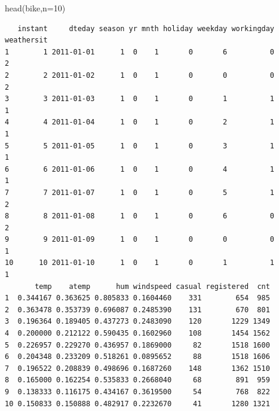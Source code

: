\documentclass[
  letterpaper,
  DIV=11,
  numbers=noendperiod]{scrreprt}
\newenvironment{Shaded}{\begin{snugshade}}{\end{snugshade}}
\newcommand{\AttributeTok}[1]{\textcolor[rgb]{0.40,0.45,0.13}{#1}}
\newcommand{\DecValTok}[1]{\textcolor[rgb]{0.68,0.00,0.00}{#1}}
\newcommand{\FunctionTok}[1]{\textcolor[rgb]{0.28,0.35,0.67}{#1}}
\newcommand{\NormalTok}[1]{\textcolor[rgb]{0.00,0.23,0.31}{#1}}
\newcommand{\OtherTok}[1]{\textcolor[rgb]{0.00,0.23,0.31}{#1}}
\newcommand{\SpecialCharTok}[1]{\textcolor[rgb]{0.37,0.37,0.37}{#1}}
\newcommand{\StringTok}[1]{\textcolor[rgb]{0.13,0.47,0.30}{#1}}
\begin{document}
\begin{Shaded}
\begin{Highlighting}[]
\FunctionTok{head}\NormalTok{(bike,}\AttributeTok{n=}\DecValTok{10}\NormalTok{)}
\end{Highlighting}
\end{Shaded}

\begin{verbatim}
   instant     dteday season yr mnth holiday weekday workingday weathersit
1        1 2011-01-01      1  0    1       0       6          0          2
2        2 2011-01-02      1  0    1       0       0          0          2
3        3 2011-01-03      1  0    1       0       1          1          1
4        4 2011-01-04      1  0    1       0       2          1          1
5        5 2011-01-05      1  0    1       0       3          1          1
6        6 2011-01-06      1  0    1       0       4          1          1
7        7 2011-01-07      1  0    1       0       5          1          2
8        8 2011-01-08      1  0    1       0       6          0          2
9        9 2011-01-09      1  0    1       0       0          0          1
10      10 2011-01-10      1  0    1       0       1          1          1
       temp    atemp      hum windspeed casual registered  cnt
1  0.344167 0.363625 0.805833 0.1604460    331        654  985
2  0.363478 0.353739 0.696087 0.2485390    131        670  801
3  0.196364 0.189405 0.437273 0.2483090    120       1229 1349
4  0.200000 0.212122 0.590435 0.1602960    108       1454 1562
5  0.226957 0.229270 0.436957 0.1869000     82       1518 1600
6  0.204348 0.233209 0.518261 0.0895652     88       1518 1606
7  0.196522 0.208839 0.498696 0.1687260    148       1362 1510
8  0.165000 0.162254 0.535833 0.2668040     68        891  959
9  0.138333 0.116175 0.434167 0.3619500     54        768  822
10 0.150833 0.150888 0.482917 0.2232670     41       1280 1321
\end{verbatim}

\begin{Shaded}
\end{Shaded}
\end{document}
